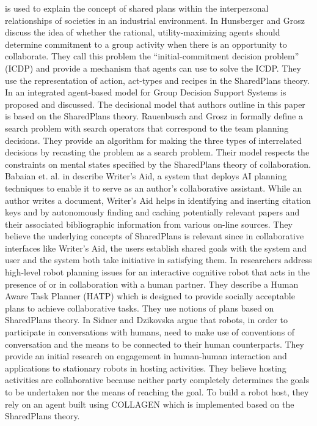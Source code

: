 \cite{grosz:plans-discourse} is used to explain the concept of shared plans
within the interpersonal relationships of societies in an industrial
environment. In \cite{hunsberger:auction-collaborative} Hunsberger and Grosz
discuss the idea of whether the rational, utility-maximizing agents should
determine commitment to a group activity when there is an opportunity to
collaborate. They call this problem the ``initial-commitment decision problem''
(ICDP) and provide a mechanism that agents can use to solve the ICDP. They use
the representation of action, act-types and recipes in the SharedPlans theory.
In \cite{zamfirescu:gdss} an integrated agent-based model for Group Decision
Support Systems is proposed and discussed. The decisional model that authors
outline in this paper is based on the SharedPlans theory. Rauenbusch and Grosz
in \cite{rauenbusch:decision-making-planning} formally define a search problem
with search operators that correspond to the team planning decisions.
They provide an algorithm for making the three types of interrelated decisions
by recasting the problem as a search problem. Their model respects the
constraints on mental states specified by the SharedPlans theory of
collaboration. Babaian et. al. in \cite{babaian:writers-assistant} describe
Writer's Aid, a system that deploys AI planning techniques to enable it to serve
as an author's collaborative assistant. While an author writes a document,
Writer's Aid helps in identifying and inserting citation keys and by
autonomously finding and caching potentially relevant papers and their
associated bibliographic information from various on-line sources. They believe
the underlying concepts of SharedPlans is relevant since in collaborative
interfaces like Writer's Aid, the users establish shared goals with the system
and user and the system both take initiative in satisfying them. In
\cite{montreuil:planning-robot-activity} researchers address high-level robot
planning issues for an interactive cognitive robot that acts in the presence of
or in collaboration with a human partner. They describe a Human Aware Task
Planner (HATP) which is designed to provide socially acceptable plans to achieve
collaborative tasks. They use notions of plans based on SharedPlans theory. In
\cite{sidner:enagagement-robot} Sidner and Dzikovska argue that robots, in order
to participate in conversations with humans, need to make use of conventions of
conversation and the means to be connected to their human counterparts. They
provide an initial research on engagement in human-human interaction and
applications to stationary robots in hosting activities. They believe hosting
activities are collaborative because neither party completely determines the
goals to be undertaken nor the means of reaching the goal. To build a robot
host, they rely on an agent built using COLLAGEN which is implemented based on
the SharedPlans theory.\\

